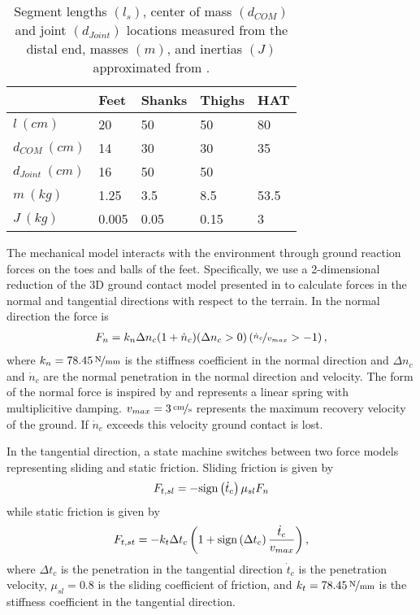 \begin{table}[b]
  \centering
      \begin{tabular}{lllll}
        \toprule
        & Feet & Shanks & Thighs & HAT \\
        \midrule
        $l         \ (\unit{cm})$ & 20    & 50   & 50   & 80   \\
        $d_{COM}   \ (\unit{cm})$ & 14    & 30   & 30   & 35   \\
        $d_{Joint} \ (\unit{cm})$ & 16    & 50   & 50   &      \\
        $m         \ (\unit{kg})$ & 1.25  & 3.5  & 8.5  & 53.5 \\
        $J         \ (\unit{kg})$ & 0.005 & 0.05 & 0.15 & 3    \\
        \bottomrule
      \end{tabular}
  \caption{Segment lengths $(l_s)$, center of mass $(d_{COM})$ and joint
  $(d_{Joint})$ locations measured from the distal end, masses $(m)$, and
  inertias $(J)$ approximated from
  \citet{gunther2003synthesis}.}\label{tab:model_mech_params}
\end{table}

The mechanical model interacts with the environment through ground reaction
forces on the toes and balls of the feet. Specifically, we use a 2-dimensional
reduction of the 3D ground contact model presented in
\citet{song2013generalization} to calculate forces in the normal and
tangential directions with respect to the terrain. In the normal direction the
force is
\begin{align}
    F_n = k_n \Delta n_c (1 + \dot n_c) (\Delta n_c  > 0)
    \left(\nicefrac{\dot n_c}{v_{max}} > -1 \right),
    \label{eq:grf_n}
\end{align}
where $k_n = \unitfrac[78.45]{N}{mm}$ is the stiffness coefficient in
the normal direction and $\Delta n_c$ and $\dot n_c$ are the normal penetration
in the normal direction and velocity. The form of the normal force is inspired
by \citet{gunther2003synthesis, scott1993biomechanical} and represents a linear
spring with multiplicitive damping.  $v_{max} = \unitfrac[3]{cm}{s}$ represents
the maximum recovery velocity of the ground. If $\dot n_c$ exceeds this
velocity ground contact is lost.

In the tangential direction, a state machine switches between two force models
representing sliding and static friction. Sliding friction is given by
\begin{align}
    F_{t,sl} = -\mathrm{sign}\left( \dot t_c \right) \mu_{sl} F_n
\end{align}
while static friction is given by
\begin{align}
    F_{t,st} = -k_t \Delta t_c \left(1 + \mathrm{sign}\left( \Delta t_c \right)
    \frac{\dot t_c}{v_{max}} \right),
\end{align}
where $\Delta t_c$ is the penetration in the tangential direction $\dot t_c$
is the penetration velocity, $\mu_{sl} = 0.8$ is the sliding coefficient of
friction, and $k_t =\unitfrac[78.45]{N}{mm}$ is the stiffness coefficient in the
tangential direction.

